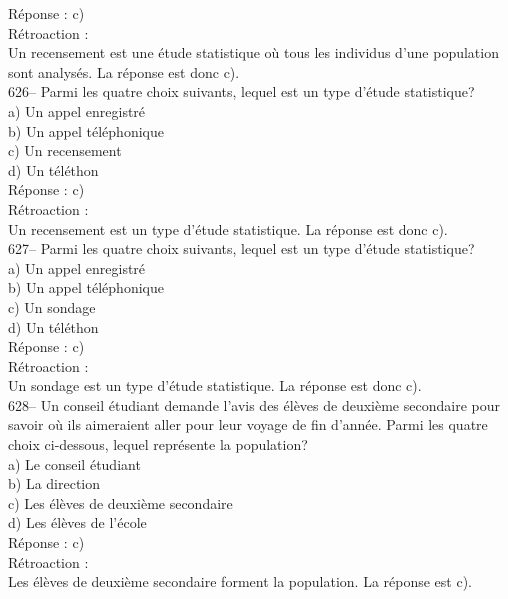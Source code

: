 ﻿\documentclass[letterpaper, 12pt]{article}
\begin{document}
R\'eponse : c)\\

R\'etroaction : \\
Un recensement est une \'etude statistique o\`u tous les individus d'une
population sont analys\'es.  La r\'eponse est donc c).\\

626-- Parmi les quatre choix suivants, lequel est un type d'\'etude
statistique?\\
a) Un appel enregistr\'e\\
b) Un appel t\'el\'ephonique\\
c) Un recensement\\
d) Un t\'el\'ethon\\

R\'eponse : c)\\

R\'etroaction : \\
Un recensement est un type d'\'etude statistique.  La r\'eponse est donc
c).\\

627-- Parmi les quatre choix suivants, lequel est un type d'\'etude
statistique?\\
a) Un appel enregistr\'e\\
b) Un appel t\'el\'ephonique\\
c) Un sondage\\
d) Un t\'el\'ethon\\

R\'eponse : c)\\

R\'etroaction : \\
Un sondage est un type d'\'etude statistique.  La r\'eponse est donc c).\\

628-- Un conseil \'etudiant demande l'avis des \'el\`eves de deuxi\`eme
secondaire pour savoir o\`u ils aimeraient aller pour leur voyage de fin
d'ann\'ee.  Parmi les quatre choix ci-dessous, lequel repr\'esente la
population?\\
a) Le conseil \'etudiant\\
b) La direction\\
c) Les \'el\`eves de deuxi\`eme secondaire\\
d) Les \'el\`eves de l'\'ecole\\

R\'eponse : c)\\

R\'etroaction : \\
Les \'el\`eves de deuxi\`eme secondaire forment la population.  La r\'eponse
est c).\\
\end{document}
